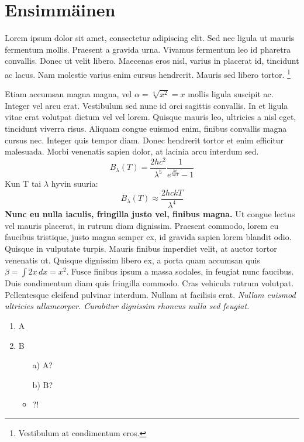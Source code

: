 \documentclass[12pt,a4paper,twoside]{article}
\begin{document}
\section{Ensimmäinen}

Lorem ipsum dolor sit amet, consectetur adipiscing elit. Sed nec ligula ut mauris fermentum mollis. Praesent a gravida urna. Vivamus fermentum leo id pharetra convallis. Donec ut velit libero. Maecenas eros nisl, varius in placerat id, tincidunt ac lacus. Nam molestie varius enim cursus hendrerit. Mauris sed libero tortor. \footnote{Vestibulum at condimentum eros.}

Etiam accumsan magna magna, vel $\alpha = \sqrt[4]{x^2} = x$ mollis ligula suscipit ac. Integer vel arcu erat. Vestibulum sed nunc id orci sagittis convallis. In et ligula vitae erat volutpat dictum vel vel lorem. Quisque mauris leo, ultricies a nisl eget, tincidunt viverra risus. Aliquam congue euismod enim, finibus convallis magna cursus nec. Integer quis tempor diam. Donec hendrerit tortor et enim efficitur malesuada. Morbi venenatis sapien dolor, at lacinia arcu interdum sed.
	\begin{displaymath}
		B_{\lambda}(T) = \frac{2hc^2}{\lambda^5} \frac{1}{e^{\frac{hc}{\lambda k T}} -1 } 
	\end{displaymath}
Kun T tai $\lambda$ hyvin suuria: \\
	\begin{equation}
		B_{\lambda}(T) \approx  \frac{2hckT}{\lambda^4}
	\end{equation}
\textbf{Nunc eu nulla iaculis, fringilla justo vel, finibus magna.} Ut congue lectus vel mauris placerat, in rutrum diam dignissim. Praesent commodo, lorem eu faucibus tristique, justo magna semper ex, id gravida sapien lorem blandit odio. Quisque in vulputate turpis. Mauris finibus imperdiet velit, at auctor tortor venenatis ut. Quisque dignissim libero ex, a porta quam accumsan quis $\beta = \int  2 x \, dx = x^2 $. Fusce finibus ipsum a massa sodales, in feugiat nunc faucibus. Duis condimentum diam quis fringilla commodo. Cras vehicula rutrum volutpat. Pellentesque eleifend pulvinar interdum. Nullam at facilisis erat. \emph{Nullam euismod ultricies ullamcorper. Curabitur dignissim rhoncus nulla sed feugiat.}

\begin{enumerate}
	\item A
	\item B
	\begin{itemize}
		\item[a)] A?
		\item[b)] B?
		\item ?!
	\end{itemize}
\end{enumerate}
\end{document}
